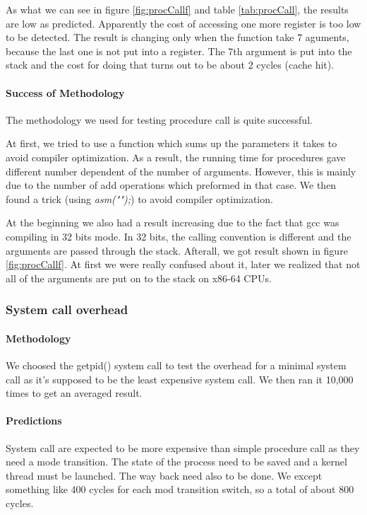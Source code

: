 As what we can see in figure \ref{fig:procCallf} and table \ref{tab:procCall}, the results are low as predicted.
Apparently the cost of accessing one more register is too low to be detected.
The result is changing only when the function take 7 aguments, because the last
one is not put into a register.
The 7th argument is put into the stack and the cost for doing that turns out to
be about 2 cycles (cache hit).

\paragraph{Success of Methodology}
The methodology we used for testing procedure call is quite successful.

At first, we tried to use a function which sums up the parameters it takes to
avoid compiler optimization.
As a result, the running time for procedures gave different number dependent of
the number of arguments.
However, this is mainly due to the number of add operations which preformed in that case.
We then found a trick (using \emph{asm("");}) to avoid compiler optimization.

At the beginning we also had a result increasing due to the fact that gcc was
compiling in 32 bits mode.
In 32 bits, the calling convention is different and the arguments are passed
through the stack.
Afterall, we got result shown in figure \ref{fig:procCallf}.
At first we were really confused about it, later we realized that not all of
the arguments are put on to the stack on x86-64 CPUs.




\subsubsection{System call overhead}
\paragraph{Methodology}
We choosed the getpid() system call to test the overhead for a minimal system
call as it's supposed to be the least expensive system call.
We then ran it 10,000 times to get an averaged result.

\paragraph{Predictions}
System call are expected to be more expensive than simple procedure call as they
need a mode transition.
The state of the process need to be saved and a kernel thread must be launched.
The way back need also to be done.
We except something like 400 cycles for each mod transition switch, so a total of about 800 cycles.

